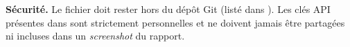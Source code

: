 \begin{warn}
\textbf{Sécurité.} Le fichier  doit rester hors du dépôt Git (listé dans ). Les clés \ac{API} présentes dans  sont strictement personnelles et ne doivent jamais être partagées ni incluses dans un \textit{screenshot} du rapport.
\end{warn}
